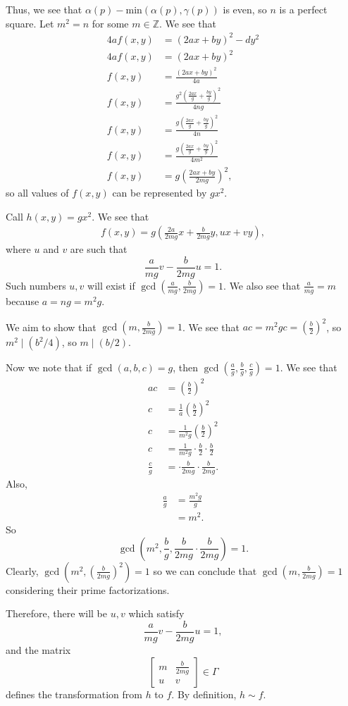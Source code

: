 \documentclass[12 pt]{amsart}
\begin{document}
  Thus, we see that 
  $\alpha(p) - \text{min}(\alpha(p), \gamma(p))$
  is even, so $n$ is a perfect square. 
  Let $m^2 = n$ for some $m \in \mathbb{Z}$.
  We see that 
  \begin{align*}
    4af(x,y) &= (2ax + by)^2 - dy^2 \\
    4af(x,y) &= (2ax + by)^2 \\
    f(x,y) &= \frac{(2ax + by)^2}{4a} \\
    f(x,y) &= \frac{g^2\left( \frac{2ax}{g} + \frac{by}{g} \right)^2}{4ng} \\
    f(x,y) &= \frac{g\left( \frac{2ax}{g} + \frac{by}{g} \right)^2}{4n} \\
    f(x,y) &= \frac{g\left( \frac{2ax}{g} + \frac{by}{g} \right)^2}{4m^2} \\
    f(x,y) &= g\left( \frac{2ax + by}{2mg} \right)^2,
  \end{align*}
  so all values of $f(x,y)$ can be represented by $gx^2$. 

  Call $h(x,y) = gx^2$. 
  We see that
  \begin{align*}
    f(x,y) = g\left(\frac{2a}{2mg}x + \frac{b}{2mg}y, ux + vy\right),
  \end{align*}
  where $u$ and $v$ are such that 
  \[
    \frac{a}{mg} v - \frac{b}{2mg}u = 1.
  \]
  Such numbers $u,v$ will exist if
  $\gcd\left( \frac{a}{mg}, \frac{b}{2mg}\right) = 1$.
  We also see that $\frac{a}{mg} = m$ because 
  $a = ng = m^2 g$. 

  We aim to show that $\gcd \left(m, \frac{b}{2mg} \right) = 1$.
  We see that $ac = m^2 g c = \left( \frac{b}{2} \right)^2$,
  so $m^2 \mid (b^2/4)$, so $m \mid (b/2)$.

  Now we note that if $\gcd(a,b,c) = g$, then
  $\gcd\left(\frac{a}{g}, \frac{b}{g}, \frac{c}{g} \right) = 1$.
  We see that 
  \begin{align*}
    ac &= \left( \frac{b}{2} \right)^2 \\
    c &= \frac{1}{a} \left( \frac{b}{2} \right)^2 \\ 
    c &= \frac{1}{m^2 g} \left( \frac{b}{2} \right)^2 \\ 
    c &= \frac{1}{m^2 g}\cdot \frac{b}{2} \cdot \frac{b}{2} \\
    \frac{c}{g} &= \cdot \frac{b}{2mg} \cdot \frac{b}{2mg}.
  \end{align*}
  Also, 
  \begin{align*}
    \frac{a}{g} &= \frac{m^2 g}{g} \\
                &= m^2.
  \end{align*}
  So 
  \[
    \gcd \left( m^2, \frac{b}{g}, \frac{b}{2mg} \cdot \frac{b}{2mg} \right)
      = 1.
  \]
  Clearly, $\gcd\left(m^2, \left(\frac{b}{2mg}\right)^2\right) = 1$
  so we can conclude that 
  $\gcd\left(m, \frac{b}{2mg}\right) = 1$ considering their 
  prime factorizations.

  Therefore, there will be $u,v$ which satisfy 
  \[
    \frac{a}{mg} v - \frac{b}{2mg}u = 1,
  \]
  and the matrix
  \[
    \begin{bmatrix}
      m & \frac{b}{2mg} \\
      u & v
    \end{bmatrix}
    \in \Gamma
  \]
  defines the transformation from $h$ to $f$.
  By definition, $h \sim f$.
\vfill
\end{document}
